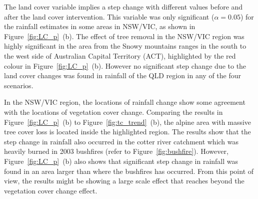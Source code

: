 \documentclass[draft,linenumbers]{agujournal}
\begin{document}
\begin{article}
The land cover variable implies a step change with different values before and after the land cover intervention. This variable was only significant ($\alpha=0.05$) for the rainfall estimates in some areas in NSW/VIC, as shown in Figure~\ref{fig:LC_p}~(b). The effect of tree removal in the NSW/VIC region was highly significant in the area from the Snowy mountains ranges in the south to the west side of Australian Capital Territory (ACT), highlighted by the red colour in Figure~\ref{fig:LC_p}~(b). However no significant step change due to the land cover changes was found in rainfall of the QLD region in any of the four scenarios. 

In the NSW/VIC region, the locations of rainfall change show some agreement with the locations of vegetation cover change. Comparing the results in Figure~\ref{fig:LC_p}~(b) to Figure~\ref{fig:tc_trend}~(b), the alpine area with massive tree cover loss is located inside the highlighted region. The results show that the step change in rainfall also occurred in the cotter river catchment which was heavily burned in 2003 bushfires (refer to Figure~\ref{fig:bushfire}). However, Figure~\ref{fig:LC_p}~(b) also shows that significant step change in rainfall was found in an area larger than where the bushfires has occurred. From this point of view, the results might be showing a large scale effect that reaches beyond the vegetation cover change effect. %



\end{article}
\end{document}
